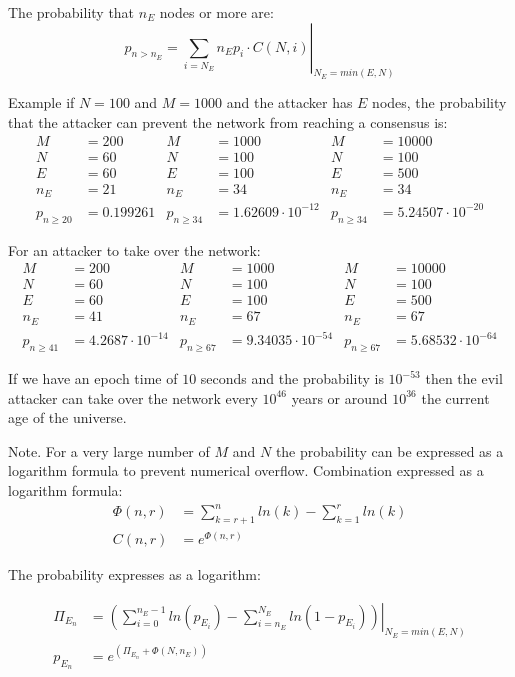 The probability that $n_E$ nodes or more are:
\begin{equation}
 p_{n>n_E} = \left. \sum_{i=N_E}{n_E}{p_i \cdot C(N,i)} \right|_{N_E = min(E,N)}
\end{equation}


Example if $N=100$ and $M=1000$ and the attacker has $E$ nodes, the probability that the attacker can prevent the network from reaching a consensus is:
\begin{align*}
 M &= 200 & M &= 1000 & M &= 10000 \\
 N &= 60 & N &= 100 & N &= 100 \\
 E &= 60 & E &= 100 & E &= 500 \\
 n_E &= 21 & n_E &= 34 & n_E &= 34 \\
 p_{n \ge 20 } &= 0.199261 & p_{n \ge 34} &= 1.62609 \cdot 10^{-12} & p_{n \ge 34} &= 5.24507 \cdot 10^{-20}
\end{align*}

For an attacker to take over the network:
\begin{align*}
 M &= 200 & M &= 1000 & M &= 10000 \\
 N &= 60 & N &= 100 & N &= 100 \\
 E &= 60 & E &= 100 & E &= 500 \\
 n_E &= 41 & n_E &= 67 & n_E &= 67 \\
 p_{n \ge 41 } &= 4.2687 \cdot 10^{-14} & p_{n \ge 67} &= 9.34035 \cdot 10^{-54} & p_{n \ge 67} &= 5.68532 \cdot 10^{-64}
\end{align*}


If we have an epoch time of $10$ seconds and the probability is $10^{-53}$ then the evil attacker can take over the network every $10^{46}$ years or around $10^{36}$ the current age of the universe.

Note.
For a very large number of $M$ and $N$ the probability can be expressed as a logarithm formula to prevent numerical overflow.
Combination expressed as a logarithm formula:
\begin{equation}
\begin{align*}
 \Phi (n,r) &= \sum_{k=r+1}^{n}{ln(k)} - \sum_{k=1}^{r}{ln(k)} \\
 C(n,r) &= e^{{\Phi}(n,r)}
\end{align*}
\end{equation}


The probability expresses as a logarithm:


\begin{equation}
\begin{align*}
{\Pi}_{E_n} &= \left. \left( \sum_{i=0}^{n_E-1}{ln(p_{E_i})} - \sum_{i=n_E}^{N_E}{ln(1-p_{E_i})} \right) 
\right|_{N_E = min(E,N)} \\
p_{E_n} &= e^{({\Pi}_{E_n}+\Phi(N,n_E))}
\end{align*}
\end{equation}


